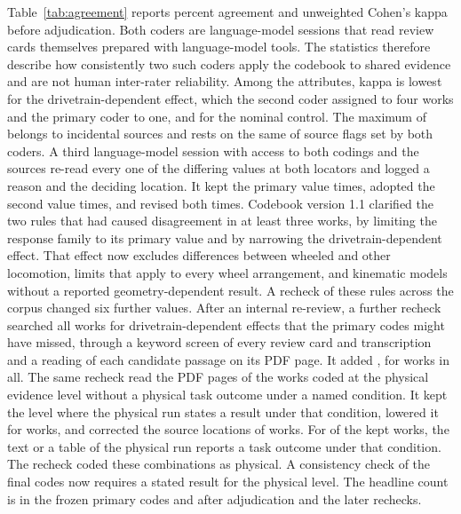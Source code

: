 \documentclass[journal]{IEEEtran}
\begin{document}
Table~\ref{tab:agreement} reports percent agreement and unweighted Cohen's kappa before adjudication. Both coders are language-model sessions that read review cards themselves prepared with language-model tools. The statistics therefore describe how consistently two such coders apply the codebook to shared evidence and are not human inter-rater reliability. Among the attributes, kappa is lowest for the drivetrain-dependent effect, which the second coder assigned to four works and the primary coder to one, and for the nominal control. The maximum of \KappaMax{} belongs to incidental sources and rests on the same \IncidentalFlags{} of \IncidentalUnits{} source flags set by both coders. A third language-model session with access to both codings and the sources re-read every one of the \DisagreeCount{} differing values at both locators and logged a reason and the deciding location. It kept the primary value \ResolvedPrimary{} times, adopted the second value \ResolvedSecond{} times, and revised both \ResolvedBoth{} times. Codebook version 1.1 clarified the two rules that had caused disagreement in at least three works, by limiting the response family to its primary value and by narrowing the drivetrain-dependent effect. That effect now excludes differences between wheeled and other locomotion, limits that apply to every wheel arrangement, and kinematic models without a reported geometry-dependent result. A recheck of these rules across the corpus changed six further values. After an internal re-review, a further recheck searched all works for drivetrain-dependent effects that the primary codes might have missed, through a keyword screen of every review card and transcription and a reading of each candidate passage on its PDF page. It added \DrivetrainRecheckAdded{}, for \DrivetrainEffectCount{} works in all. The same recheck read the PDF pages of the \LevelRecheckWorks{} works coded at the physical evidence level without a physical task outcome under a named condition. It kept the level where the physical run states a result under that condition, lowered it for \LevelRecheckRevised{} works, and corrected the source locations of \LocatorCorrectionWorks{} works. For \SettingRecheckRevised{} of the kept works, the text or a table of the physical run reports a task outcome under that condition. The recheck coded these combinations as physical. A consistency check of the final codes now requires a stated result for the physical level. The headline count is \DegTaskCountPrimary{} in the frozen primary codes and \DegTaskCount{} after adjudication and the later rechecks.
\end{document}
